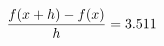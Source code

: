 \documentclass[preview]{standalone}
\begin{document}
\begin{align*}
\special{dvisvgm:raw <g id='unique000'>}\frac{f(x+h)-f(x)}{h} = 3.511\special{dvisvgm:raw </g>}
\end{align*}
\end{document}
